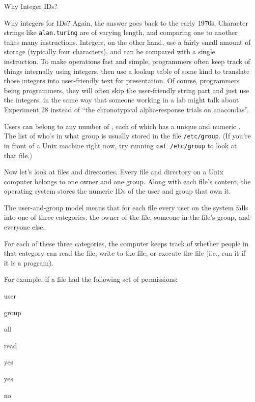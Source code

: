 \begin{swcbox}{Why Integer IDs?}

Why integers for IDs? Again, the answer goes back to the early 1970s.
Character strings like \texttt{alan.turing} are of varying length, and
comparing one to another takes many instructions. Integers, on the other
hand, use a fairly small amount of storage (typically four characters),
and can be compared with a single instruction. To make operations fast
and simple, programmers often keep track of things internally using
integers, then use a lookup table of some kind to translate those
integers into user-friendly text for presentation. Of course,
programmers being programmers, they will often skip the user-friendly
string part and just use the integers, in the same way that someone
working in a lab might talk about Experiment 28 instead of ``the
chronotypical alpha-response trials on anacondas''.

\end{swcbox}

Users can belong to any number of , each
of which has a unique  and
numeric . The list of who's in what
group is usually stored in the file \texttt{/etc/group}. (If you're in
front of a Unix machine right now, try running \texttt{cat /etc/group}
to look at that file.)

Now let's look at files and directories. Every file and directory on a
Unix computer belongs to one owner and one group. Along with each file's
content, the operating system stores the numeric IDs of the user and
group that own it.

The user-and-group model means that for each file every user on the
system falls into one of three categories: the owner of the file,
someone in the file's group, and everyone else.

For each of these three categories, the computer keeps track of whether
people in that category can read the file, write to the file, or execute
the file (i.e., run it if it is a program).

For example, if a file had the following set of permissions:

user

group

all

read

yes

yes

no

